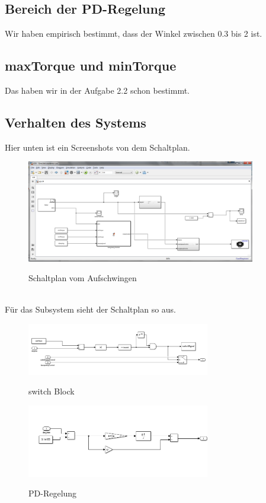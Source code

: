 \documentclass{article}
\begin{document}
\subsection{Bereich der PD-Regelung}
Wir haben empirisch bestimmt, dass der Winkel zwischen 0.3 bis 2 ist.
\subsection{maxTorque und minTorque}
Das haben wir in der Aufgabe 2.2 schon bestimmt.
\subsection{Verhalten des Systems}\label{section:last}
Hier unten ist ein Screenshots von dem Schaltplan.
\begin{figure}[h]
  \caption{Schaltplan vom Aufschwingen}
  \centering
  \includegraphics[width=10cm]{a24}
  \label{fig:schaltplan24}
\end{figure}\\
Für das Subsystem sieht der Schaltplan so aus.
\begin{figure}[h]
  \caption{switch Block}
  \centering
  \includegraphics[width=8cm]{switch}
  \label{fig:switch}
\end{figure}
\begin{figure}[h]
  \caption{PD-Regelung}
  \centering
  \includegraphics[width=8cm]{a24Sub1}
  \label{fig:pdRegelung}
\end{figure}\\
\end{document}
